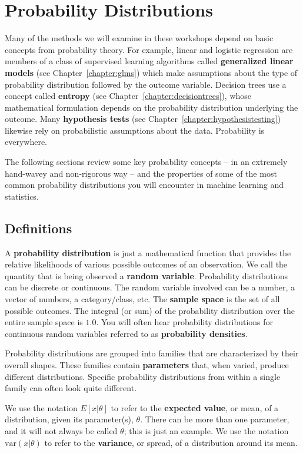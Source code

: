 \chapter{Probability Distributions \label{chapter:probabilitydistributions}}

Many of the methods we will examine in these workshops depend on basic concepts from probability theory. For example, linear and logistic regression are members of a class of supervised learning algorithms called \textbf{generalized linear models} (see Chapter~\ref{chapter:glms}) which make assumptions about the type of probability distribution followed by the outcome variable. Decision trees use a concept called \textbf{entropy} (see Chapter~\ref{chapter:decisiontrees}), whose mathematical formulation depends on the probability distribution underlying the outcome. Many \textbf{hypothesis tests} (see Chapter~\ref{chapter:hypothesistesting}) likewise rely on probabilistic assumptions about the data. Probability is everywhere.

The following sections review some key probability concepts -- in an extremely hand-wavey and non-rigorous way -- and the properties of some of the most common probability distributions you will encounter in machine learning and statistics. 

\section{Definitions}

A \textbf{probability distribution} is just a mathematical function that provides the relative likelihoods of various possible outcomes of an observation. We call the quantity that is being observed a \textbf{random variable}. Probability distributions can be discrete or continuous. The random variable involved can be a number, a vector of numbers, a category/class, etc. The \textbf{sample space} is the set of all possible outcomes. The integral (or sum) of the probability distribution over the entire sample space is $1.0$. You will often hear probability distributions for continuous random variables referred to as \textbf{probability densities}. 

Probability distributions are grouped into families that are characterized by their overall shapes. These families contain \textbf{parameters} that, when varied, produce different distributions. Specific probability distributions from within a single family can often look quite different. 

We use the notation $E[x|\theta]$ to refer to the \textbf{expected value}, or mean, of a distribution, given its parameter(s), $\theta$. There can be more than one parameter, and it will not always be called $\theta$; this is just an example. We use the notation $\text{var}(x|\theta)$ to refer to the \textbf{variance}, or spread, of a distribution around its mean. 

